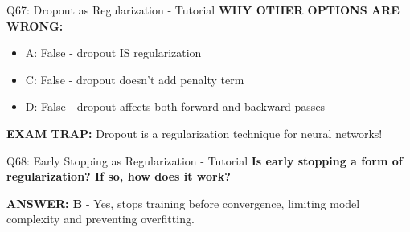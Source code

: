 \documentclass[8pt]{beamer}
\begin{document}
\begin{frame}{Q67: Dropout as Regularization - Tutorial}
		\vspace{0.05cm}
		\textcolor{myred}{\textbf{WHY OTHER OPTIONS ARE WRONG:}}
		\begin{itemize}
			\item \textcolor{myred}{A:} False - dropout IS regularization
			\item \textcolor{myred}{C:} False - dropout doesn't add penalty term
			\item \textcolor{myred}{D:} False - dropout affects both forward and backward passes
		\end{itemize}
		
		\textcolor{myred}{\textbf{EXAM TRAP:}} Dropout is a regularization technique for neural networks!
	\end{frame}
	
	\begin{frame}{Q68: Early Stopping as Regularization - Tutorial}
		\fontsize{6.5}{7.5}\selectfont
		\textbf{Is early stopping a form of regularization? If so, how does it work?}
		
		\vspace{0.05cm}
		\textcolor{myblue}{\textbf{ANSWER: B}} - Yes, stops training before convergence, limiting model complexity and preventing overfitting.
		

\end{frame}
\end{document}
